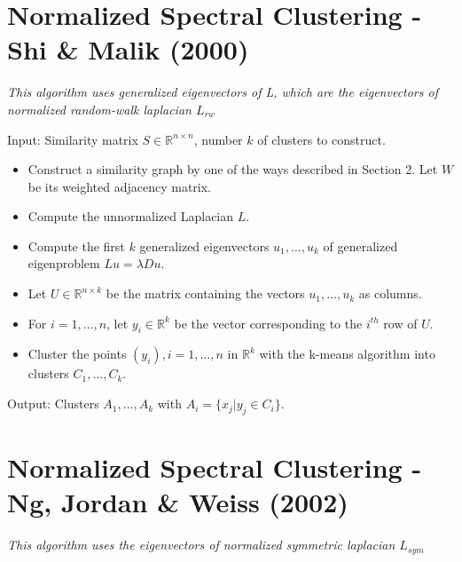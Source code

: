 \documentclass[10pt,a4paper, nocenter]{report}
\begin{document}
	\section{Normalized Spectral Clustering - Shi \& Malik (2000)\cite{Shi-Malik-maxcut-00}}
	\textit{This algorithm uses generalized eigenvectors of L, which are the eigenvectors of normalized random-walk laplacian $L_{rw}$}
	
	Input: Similarity matrix $S \in \mathbb{R}^{n\times n}$, number $k$ of clusters to construct.
	\begin{itemize}
		\item Construct a similarity graph by one of the ways described in Section 2. Let $W$ be its weighted adjacency matrix.
		\item Compute the unnormalized Laplacian $L$.
		\item Compute the first $k$ generalized eigenvectors $u_{1},\dots, u_{k} $ of generalized eigenproblem $Lu = \lambda Du$.
		\item Let $U \in \mathbb{R}^{n\times k}$ be the matrix containing the vectors $u_{1},\dots, u_{k}$ as columns.
		\item For $i = 1,\dots, n$, let $y_{i} \in \mathbb{R}^k$ be the vector corresponding to the $i^{th}$ row of $U$.
		\item Cluster the points $(y_{i}), i=1,\dots,n$ in $\mathbb{R}^k$ with the k-means algorithm into clusters $C_{1},\dots, C_{k}$.
	\end{itemize}
	Output: Clusters $A_{1},\dots, A_{k}$ with $A_{i} = \{x_{j}| y_{j} \in C_{i}\}$.

	\section{Normalized Spectral Clustering - Ng, Jordan \& Weiss (2002)\cite{ng-jordan-01}}
	\textit{This algorithm uses the eigenvectors of normalized symmetric laplacian $L_{sym}$}
\end{document}
